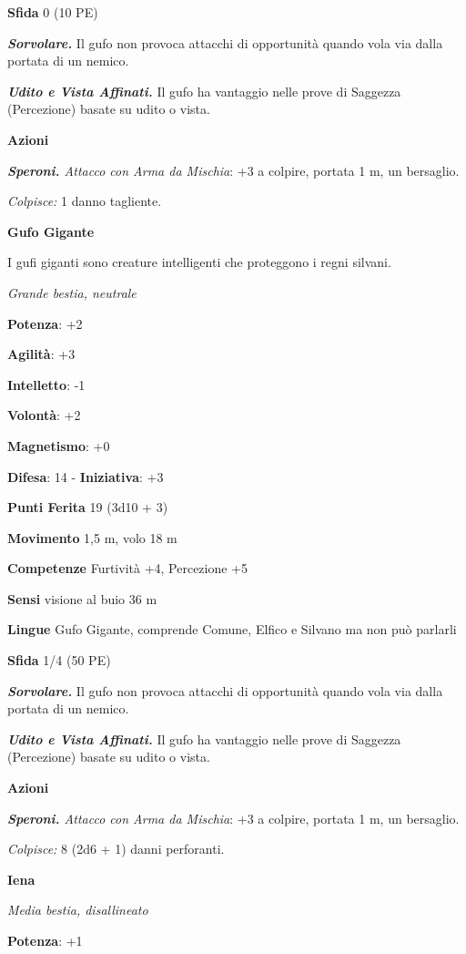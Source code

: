 \begin{multicols}{2}
\textbf{Sfida} 0 (10 PE)\smallskip

\emph{\textbf{Sorvolare.}} Il gufo non provoca attacchi di opportunità
quando vola via dalla portata di un nemico.

\emph{\textbf{Udito e Vista Affinati.}} Il gufo ha vantaggio nelle prove
di Saggezza (Percezione) basate su udito o vista.

\smallskip\textbf{Azioni}

\emph{\textbf{Speroni.} Attacco con Arma da Mischia}: +3 a colpire,
portata 1 m, un bersaglio.

\emph{Colpisce:} 1 danno tagliente.

\textbf{Gufo Gigante}

I gufi giganti sono creature intelligenti che proteggono i regni
silvani.

\emph{Grande bestia, neutrale}

\textbf{Potenza}: +2

\textbf{Agilità}: +3

\textbf{Intelletto}: -1

\textbf{Volontà}: +2

\textbf{Magnetismo}: +0

\textbf{Difesa}: 14 - \textbf{Iniziativa}: +3

\textbf{Punti Ferita} 19 (3d10 + 3)

\textbf{Movimento} 1,5 m, volo 18 m

\textbf{Competenze} Furtività +4, Percezione +5

\textbf{Sensi} visione al buio 36 m

\textbf{Lingue} Gufo Gigante, comprende Comune, Elfico e Silvano ma non
può parlarli

\textbf{Sfida} 1/4 (50 PE)\smallskip

\emph{\textbf{Sorvolare.}} Il gufo non provoca attacchi di opportunità
quando vola via dalla portata di un nemico.

\emph{\textbf{Udito e Vista Affinati.}} Il gufo ha vantaggio nelle prove
di Saggezza (Percezione) basate su udito o vista.

\smallskip\textbf{Azioni}

\emph{\textbf{Speroni.} Attacco con Arma da Mischia}: +3 a colpire,
portata 1 m, un bersaglio.

\emph{Colpisce:} 8 (2d6 + 1) danni perforanti.

\textbf{Iena}

\emph{Media bestia, disallineato}

\textbf{Potenza}: +1


\end{multicols}
